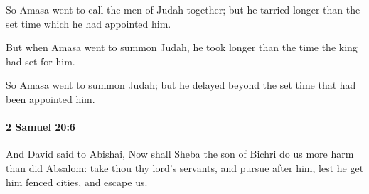 			\begin{versebox}
					\item[BHS] 
					\item[ASV] So Amasa went to call the men of Judah together; but he tarried longer than the set time which he had appointed him.
					\item[NIV] But when Amasa went to summon Judah, he took longer than the time the king had set for him.
					\item[NRSV] So Amasa went to summon Judah; but he delayed beyond the set time that had been appointed him.
			\end{versebox}

		\paragraph{2 Samuel 20:6} %
			\label{2SAMUEL-20-6}

			And David said to Abishai, Now shall Sheba the son of Bichri do us more harm than did Absalom: take thou thy lord’s servants, and pursue after him, lest he get him fenced cities, and escape us.


